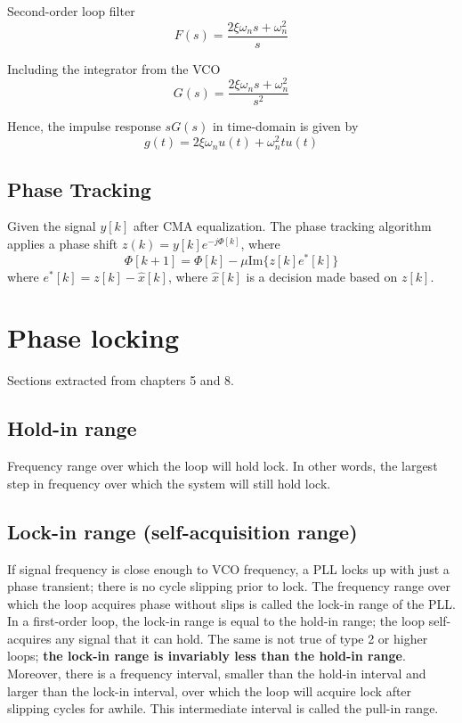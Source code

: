 \documentclass[a4paper]{article}
\begin{document}
Second-order loop filter
\begin{equation}
F(s) = \frac{2\xi\omega_ns + \omega_n^2}{s}
\end{equation}

Including the integrator from the VCO
\begin{equation}
G(s) = \frac{2\xi\omega_ns + \omega_n^2}{s^2}
\end{equation}

Hence, the impulse response $sG(s)$ in time-domain is given by
\begin{equation}
g(t) = 2\xi\omega_nu(t) + \omega_n^2tu(t)
\end{equation}


\subsection{Phase Tracking}
\cite{Phase1995}

Given the signal $y[k]$ after CMA equalization. The phase tracking algorithm applies a phase shift $z(k) = y[k]e^{-j\Phi[k]}$, where
\begin{equation}
\Phi[k+1] = \Phi[k]-\mu\mathrm{Im}\{z[k]e^*[k]\}
\end{equation}
where $e^*[k] = z[k] - \hat{x}[k]$, where $\hat{x}[k]$ is a decision made based on $z[k]$.

\section{Phase locking}
Sections extracted from \cite{Gardner} chapters 5 and 8. 

\subsection{Hold-in range}
Frequency range over which the loop will hold lock. In other words, the largest step in frequency over which the system will still hold lock.	

\subsection{Lock-in range (self-acquisition range)}

If signal frequency is close enough to VCO frequency, a PLL locks up with
just a phase transient; there is no cycle slipping prior to lock. The frequency range over which the loop acquires phase without slips is called the lock-in range of the PLL. In a first-order loop, the lock-in range is equal to the hold-in range; the loop self-acquires any signal that it can hold. The same is not true of type 2 or higher loops; \textbf{the lock-in range is invariably less than the hold-in range}. Moreover, there is a frequency interval, smaller than the hold-in interval
and larger than the lock-in interval, over which the loop will acquire lock after slipping cycles for awhile. This intermediate interval is called the pull-in range.
\end{document}
